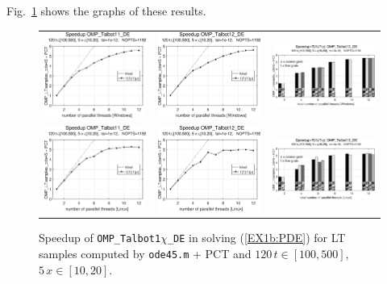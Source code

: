 \documentclass[a4paper,10pt]{report}%
\begin{document}
Fig.~\ref{PAR_EX1b_speedup_ode45PCT} shows the graphs of these results.
\begin{figure}[htb]
\centering
\begin{tabular}{ccc} %
\includegraphics[height=0.2\textwidth]{./FIGS/EX1b/EX1b_ode45_PCT_speedup_11_Windows.eps} &
\includegraphics[height=0.2\textwidth]{./FIGS/EX1b/EX1b_ode45_PCT_speedup_12_Windows.eps} &
\includegraphics[height=0.2\textwidth,keepaspectratio=true]{./FIGS/EX1b/EX1b_ode45_PCT_speedup_13_Windows.eps} \\
\includegraphics[height=0.2\textwidth]{./FIGS/EX1b/EX1b_ode45_PCT_speedup_11_Linux.eps} &
\includegraphics[height=0.2\textwidth]{./FIGS/EX1b/EX1b_ode45_PCT_speedup_12_Linux.eps} &
\includegraphics[height=0.2\textwidth,keepaspectratio=true]{./FIGS/EX1b/EX1b_ode45_PCT_speedup_13_Linux.eps}
\end{tabular}
\caption{\small Speedup of {\tt OMP\_Talbot1$\chi$\_DE} in solving (\ref{EX1b:PDE}) for LT samples
computed by {\tt ode45.m} + PCT and $120\,t\in[100,500]$, $5\,x\in[10,20]$.}
\label{PAR_EX1b_speedup_ode45PCT}
\end{figure}
\end{document}
